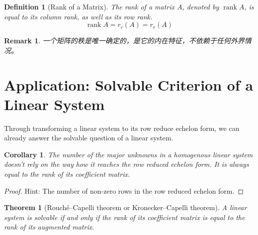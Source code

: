 \documentclass[onecolumn]{ctexart}
\newtheorem{definition}{Definition}
\newtheorem{theorem}{Theorem}
\newtheorem{corollary}{Corollary}
\newtheorem{remark}{Remark}
\DeclareMathOperator{\rank}{rank}
\begin{document}
\begin{definition}[Rank of a Matrix]
  The rank of a matrix $A$, denoted by $\rank A$, is equal to its column rank, 
  as well as its row rank.
  \[
    \rank A = r_c(A) = r_r(A)
  \]
\end{definition}
\begin{remark}
  一个矩阵的秩是唯一确定的，是它的内在特征，不依赖于任何外界情况。
\end{remark}

\section{Application: Solvable Criterion of a Linear System}

Through transforming a linear system to its row reduce echelon form, we can 
already answer the solvable question of a linear system.

\begin{corollary}
  The number of the major unknowns in a homogenous linear system doesn't rely on 
  the way how it reaches the row reduced echelon form. It is always equal to the 
  rank of its coefficient matrix.
\end{corollary}
\begin{proof}
  Hint: The number of non-zero rows in the row reduced echelon form.
\end{proof}

\begin{theorem}[Rouché–Capelli theorem or Kronecker–Capelli theorem]
  A linear system is solvable if and only if the rank of its coefficient matrix 
  is equal to the rank of its augmented matrix.
\end{theorem}
\end{document}

